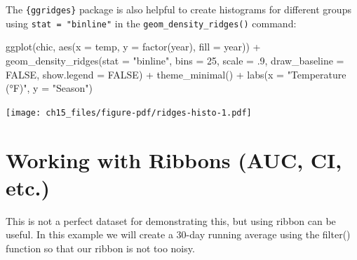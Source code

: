 \documentclass[
  letterpaper,
]{scrbook}
\newenvironment{Shaded}{\begin{snugshade}}{\end{snugshade}}
\newcommand{\AttributeTok}[1]{\textcolor[rgb]{0.40,0.45,0.13}{#1}}
\newcommand{\ConstantTok}[1]{\textcolor[rgb]{0.56,0.35,0.01}{#1}}
\newcommand{\DecValTok}[1]{\textcolor[rgb]{0.68,0.00,0.00}{#1}}
\newcommand{\FunctionTok}[1]{\textcolor[rgb]{0.28,0.35,0.67}{#1}}
\newcommand{\NormalTok}[1]{\textcolor[rgb]{0.00,0.23,0.31}{#1}}
\newcommand{\OtherTok}[1]{\textcolor[rgb]{0.00,0.23,0.31}{#1}}
\newcommand{\SpecialCharTok}[1]{\textcolor[rgb]{0.37,0.37,0.37}{#1}}
\newcommand{\StringTok}[1]{\textcolor[rgb]{0.13,0.47,0.30}{#1}}
\begin{document}
The \texttt{\{ggridges\}} package is also helpful to create histograms
for different groups using \texttt{stat\ =\ "binline"} in the
\texttt{geom\_density\_ridges()} command:

\begin{Shaded}
\begin{Highlighting}[]
\FunctionTok{ggplot}\NormalTok{(chic, }\FunctionTok{aes}\NormalTok{(}\AttributeTok{x =}\NormalTok{ temp, }\AttributeTok{y =} \FunctionTok{factor}\NormalTok{(year), }\AttributeTok{fill =}\NormalTok{ year)) }\SpecialCharTok{+}
  \FunctionTok{geom\_density\_ridges}\NormalTok{(}\AttributeTok{stat =} \StringTok{"binline"}\NormalTok{, }\AttributeTok{bins =} \DecValTok{25}\NormalTok{, }\AttributeTok{scale =}\NormalTok{ .}\DecValTok{9}\NormalTok{,}
                      \AttributeTok{draw\_baseline =} \ConstantTok{FALSE}\NormalTok{, }\AttributeTok{show.legend =} \ConstantTok{FALSE}\NormalTok{) }\SpecialCharTok{+}
  \FunctionTok{theme\_minimal}\NormalTok{() }\SpecialCharTok{+}
  \FunctionTok{labs}\NormalTok{(}\AttributeTok{x =} \StringTok{"Temperature (°F)"}\NormalTok{, }\AttributeTok{y =} \StringTok{"Season"}\NormalTok{)}
\end{Highlighting}
\end{Shaded}

\texttt{[image: ch15\_files/figure-pdf/ridges-histo-1.pdf]}


\chapter{Working with Ribbons (AUC, CI, etc.)}\label{ribbons}

This is not a perfect dataset for demonstrating this, but using ribbon
can be useful. In this example we will create a 30-day running average
using the filter() function so that our ribbon is not too noisy.

\begin{Shaded}
\end{Shaded}
\end{document}
